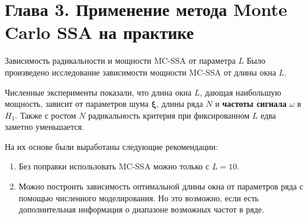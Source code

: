 \documentclass[pdf,notheorems,10pt,intlimits, unicode]{beamer}
\begin{document}
\section{Глава 3. Применение метода Monte Carlo SSA на практике}
\begin{frame}{Зависимость радикальности и мощности MC-SSA от
  параметра $L$}
  Было произведено исследование зависимости мощности MC-SSA от длины окна $L$.\medskip
      
  Численные эксперименты показали, что длина окна $L$, дающая наибольшую мощность, зависит от параметров шума $\boldsymbol{\xi}$, длины ряда $N$ и \textbf{частоты сигнала} $\omega$ в $H_1$. Также с ростом $N$ радикальность критерия при фиксированном $L$ едва заметно уменьшается.\medskip
      
  На их основе были выработаны следующие рекомендации:
  \begin{enumerate}
    \item Без поправки использовать MC-SSA можно только с $L=10$.
    \item Можно построить зависимость оптимальной длины окна от параметров ряда с помощью численного моделирования. Но это возможно, если есть дополнительная информация о диапазоне возможных частот в ряде.
  \end{enumerate}
\end{frame}
\end{document}
